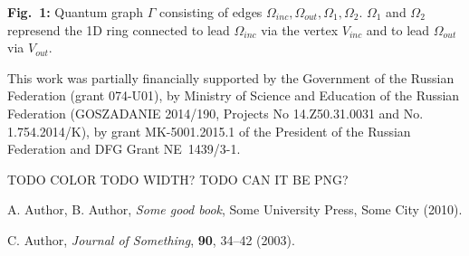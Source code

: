 \documentclass[12pt,twoside]{article}
\begin{document}
{\narrower\noindent \textbf{Fig.~1:}
Quantum graph $\Gamma$ consisting of edges $\Omega_{inc}, \Omega_{out}, \Omega_1, \Omega_2$. $\Omega_1$ and $\Omega_2$ represend the 1D ring connected to lead $\Omega_{inc}$ via the vertex $V_{inc}$ and to lead $\Omega_{out}$ via $V_{out}$.
\par}

\medskip


This work was partially financially supported by the Government of the Russian Federation (grant 074-U01), by Ministry of Science and Education of the Russian Federation (GOSZADANIE 2014/190, Projects No 14.Z50.31.0031 and No. 1.754.2014/K), by grant MK-5001.2015.1 of the President of the Russian Federation and DFG Grant NE~1439/3-1.


TODO COLOR
TODO WIDTH?
TODO CAN IT BE PNG?




\begin{thebibliography}{9}

 A. Author, B. Author, \textit{Some good book}, Some University Press, Some City
(2010).

 C. Author, \textit{Journal of Something}, \textbf{90}, 34--42 (2003).

\end{thebibliography}
\end{document}
